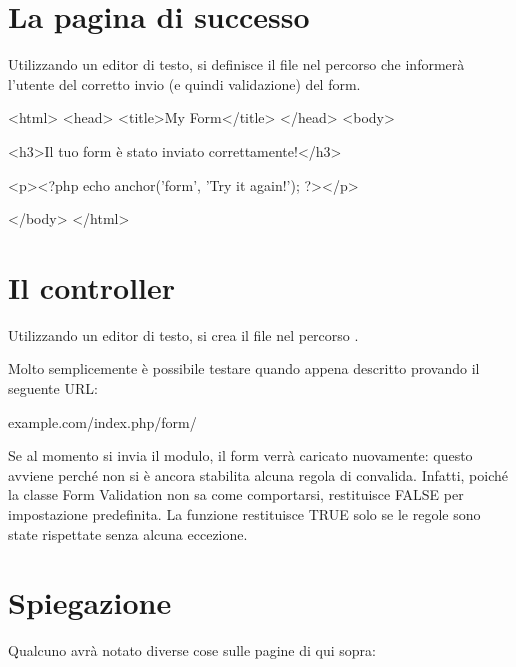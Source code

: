 \section*{La pagina di successo}
Utilizzando un editor di testo, si definisce il file  nel percorso  che informerà l'utente del corretto invio (e quindi validazione) del form.

\begin{html}
<html>
<head>
<title>My Form</title>
</head>
<body>

<h3>Il tuo form è stato inviato correttamente!</h3>

<p><?php echo anchor('form', 'Try it again!'); ?></p>

</body>
</html>
\end{html}

\section*{Il controller}
Utilizzando un editor di testo, si crea il file  nel percorso .


Molto semplicemente è possibile testare quando appena descritto provando il seguente \ac{URL}:

\begin{code}
example.com/index.php/form/
\end{code}

Se al momento si invia il modulo, il form verrà caricato nuovamente: questo avviene perché non si è ancora stabilita alcuna regola di convalida. Infatti, poiché la classe Form Validation non sa come comportarsi, restituisce FALSE per impostazione predefinita. La funzione  restituisce TRUE solo se le regole sono state rispettate senza alcuna eccezione.

\section*{Spiegazione}
Qualcuno avrà notato diverse cose sulle pagine di qui sopra:

